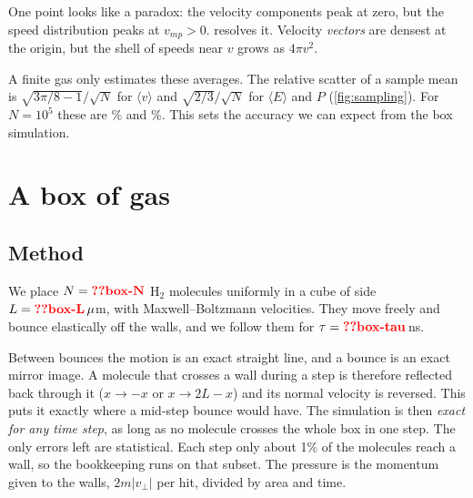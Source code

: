 \documentclass[aps,prd,twocolumn,nofootinbib,floatfix,superscriptaddress]{revtex4-2}
\begin{document}
One point looks like a paradox: the velocity components peak at zero, but the speed distribution peaks at $v_{mp}>0$.
 resolves it.
Velocity \emph{vectors} are densest at the origin, but the shell of speeds near $v$ grows as $4\pi v^2$.

A finite gas only estimates these averages.
The relative scatter of a sample mean is $\sqrt{3\pi/8-1}/\sqrt N$ for $\langle v\rangle$ and $\sqrt{2/3}/\sqrt N$ for $\langle E\rangle$ and $P$ (\cref{fig:sampling}).
For $N=10^5$ these are \% and \%.
This sets the accuracy we can expect from the box simulation.


\section{A box of gas}\label{sec:box}
\subsection{Method}
We place $N=\val{box-N}$ H$_2$ molecules uniformly in a cube of side $L=\val{box-L}\,\mu$m, with Maxwell--Boltzmann velocities.
They move freely and bounce elastically off the walls, and we follow them for $\tau=\val{box-tau}\,$ns.

Between bounces the motion is an exact straight line, and a bounce is an exact mirror image.
A molecule that crosses a wall during a step is therefore reflected back through it ($x\to-x$ or $x\to2L-x$) and its normal velocity is reversed.
This puts it exactly where a mid-step bounce would have.
The simulation is then \emph{exact for any time step}, as long as no molecule crosses the whole box in one step.
The only errors left are statistical.
Each step only about 1\% of the molecules reach a wall, so the bookkeeping runs on that subset.
The pressure is the momentum given to the walls, $2m|v_\perp|$ per hit, divided by area and time.
\end{document}
